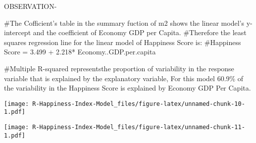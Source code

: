 \documentclass[
]{article}
\newenvironment{Shaded}{\begin{snugshade}}{\end{snugshade}}
\newcommand{\AttributeTok}[1]{\textcolor[rgb]{0.77,0.63,0.00}{#1}}
\newcommand{\CommentTok}[1]{\textcolor[rgb]{0.56,0.35,0.01}{\textit{#1}}}
\newcommand{\DecValTok}[1]{\textcolor[rgb]{0.00,0.00,0.81}{#1}}
\newcommand{\FunctionTok}[1]{\textcolor[rgb]{0.00,0.00,0.00}{#1}}
\newcommand{\NormalTok}[1]{#1}
\newcommand{\SpecialCharTok}[1]{\textcolor[rgb]{0.00,0.00,0.00}{#1}}
\begin{document}
OBSERVATION-

\#The Cofficient's table in the summary fuction of m2 shows the linear
model's y-intercept and the coefficient of Economy GDP per Capita.
\#Therefore the least squares regression line for the linear model of
Happiness Score is: \#Happiness Score = 3.499 + 2.218*
Economy..GDP.per.capita

\#Multiple R-squared representsthe proportion of variability in the
response variable that is explained by the explanatory variable, For
this model 60.9\% of the variability in the Happiness Score is explained
by Economy GDP Per Capita.

\begin{Shaded}
\end{Shaded}

\texttt{[image: R-Happiness-Index-Model\_files/figure-latex/unnamed-chunk-10-1.pdf]}

\begin{Shaded}
\end{Shaded}

\texttt{[image: R-Happiness-Index-Model\_files/figure-latex/unnamed-chunk-11-1.pdf]}

\begin{Shaded}
\end{Shaded}
\end{document}
